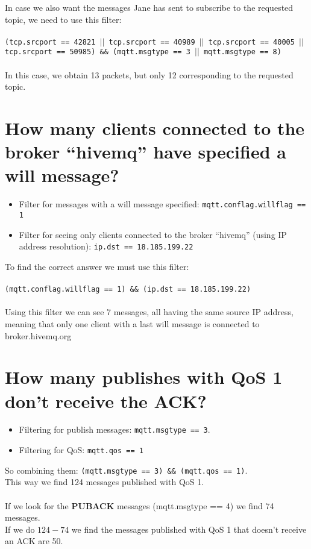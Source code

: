 \documentclass{article} %
\begin{document}
    In case we also want the messages Jane has sent to subscribe to the requested topic, we need to use this filter: \\ \\ 
    \texttt{(tcp.srcport == 42821 $||$ tcp.srcport == 40989 $||$ tcp.srcport == 40005 $||$ tcp.srcport == 50985) \&\&  (mqtt.msgtype == 3 $||$ mqtt.msgtype == 8)} \\ \\
    In this case, we obtain 13 packets, but only 12 corresponding to the requested topic.
 

\section{\large{How many clients connected to the broker “hivemq” have specified a will message?}}
    \begin{itemize}
        \item Filter for messages with a will message specified: \texttt{mqtt.conflag.willflag == 1}
        \item Filter for seeing only clients connected to the broker “hivemq” (using IP address resolution): \texttt{ip.dst == 18.185.199.22}
    \end{itemize}
    To find the correct answer we must use this filter: \\ \\
    \texttt{(mqtt.conflag.willflag == 1) \&\& (ip.dst == 18.185.199.22)} \\ \\
    Using this filter we can see 7 messages, all having the same source IP address, meaning that only one client with a last will message is connected to broker.hivemq.org


\section{\large{How many publishes with QoS 1 don’t receive the ACK?}}
    \begin{itemize}
        \item Filtering for publish messages: \texttt{mqtt.msgtype == 3}.
        \item Filtering for QoS: \texttt{mqtt.qos == 1}
    \end{itemize}
    So combining them: \texttt{(mqtt.msgtype == 3) \&\& (mqtt.qos == 1)}.\\
    This way we find 124 messages published with QoS 1. \\ \\
    If we look for the \textbf{PUBACK} messages (mqtt.msgtype == 4) we find 74 messages. \\
    If we do $124-74$ we find the messages published with QoS 1 that doesn’t receive an ACK are 50.
\end{document}
